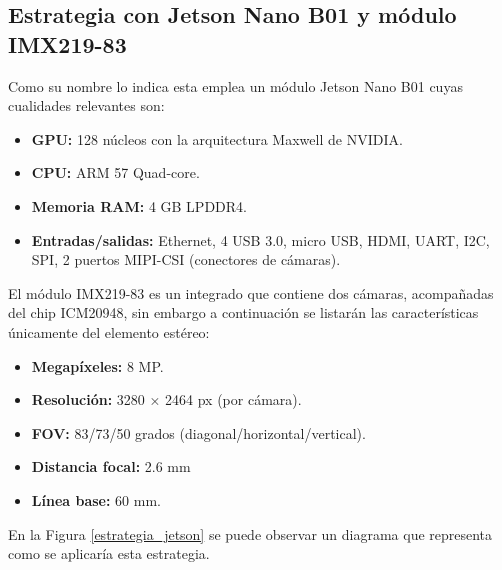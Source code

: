 \subsection{Estrategia con Jetson Nano B01 y módulo IMX219-83}
Como su nombre lo indica esta emplea un módulo Jetson Nano B01 cuyas cualidades relevantes son:
\begin{itemize}
    \item \textbf{GPU:} 128 núcleos con la arquitectura Maxwell de NVIDIA.
    \item \textbf{CPU:} ARM 57 Quad-core.
    \item \textbf{Memoria RAM:} 4 GB LPDDR4.
    \item \textbf{Entradas/salidas:} Ethernet, 4 USB 3.0, micro USB, HDMI, UART, I2C, SPI, 2 puertos MIPI-CSI (conectores de cámaras).
\end{itemize}
El módulo IMX219-83 es un integrado que contiene dos cámaras, acompañadas del chip ICM20948, sin embargo a continuación se listarán las características únicamente del elemento estéreo:
\begin{itemize}
    \item \textbf{Megapíxeles:} 8 MP.
    \item \textbf{Resolución:} 3280 × 2464 px (por cámara).
    \item \textbf{FOV:} 83/73/50 grados (diagonal/horizontal/vertical).
    \item \textbf{Distancia focal:} 2.6 mm
    \item \textbf{Línea base:} 60 mm.
\end{itemize}
En la Figura \ref{estrategia_jetson} se puede observar un diagrama que representa como se aplicaría esta estrategia.
